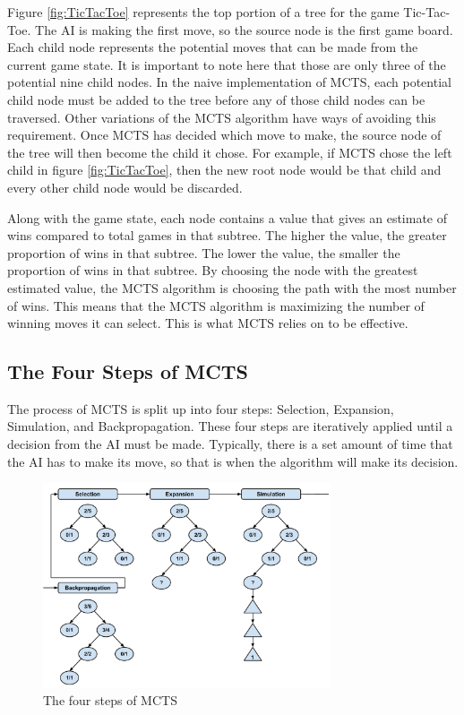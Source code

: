 \documentclass{sig-alternate}
\begin{document}
Figure \ref{fig:TicTacToe} represents the top portion of a tree for the game Tic-Tac-Toe. The AI is making the first move, so the source node is the first game board. Each child node represents the potential moves that can be made from the current game state. It is important to note here that those are only three of the potential nine child nodes. In the naive implementation of MCTS, each potential child node must be added to the tree before any of those child nodes can be traversed. Other variations of the MCTS algorithm have ways of avoiding this requirement\cite{ActionSelection}. Once MCTS has decided which move to make, the source node of the tree will then become the child it chose. For example, if MCTS chose the left child in figure \ref{fig:TicTacToe}, then the new root node would be that child and every other child node would be discarded. 

Along with the game state, each node contains a value that gives an estimate of wins compared to total games in that subtree. The higher the value, the greater proportion of wins in that subtree. The lower the value, the smaller the proportion of wins in that subtree. By choosing the node with the greatest estimated value, the MCTS algorithm is choosing the path with the most number of wins. This means that the MCTS algorithm is maximizing the number of winning moves it can select. This is what MCTS relies on to be effective.

\subsection{The Four Steps of MCTS}
The process of MCTS is split up into four steps: Selection, Expansion, Simulation, and Backpropagation. These four steps are iteratively applied until a decision from the AI must be made. Typically, there is a set amount of time that the AI has to make its move, so that is when the algorithm will make its decision.

\begin{figure}[h]
	\includegraphics[width=8.5cm]{MCTSFourStepProcess.pdf}
	\centering
	\caption{The four steps of MCTS}
	\label{fig:FourSteps}
\end{figure}
\end{document}
